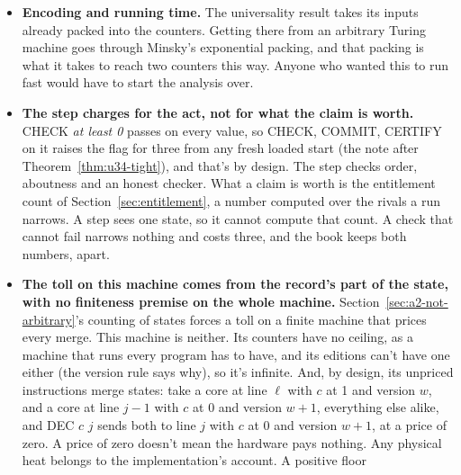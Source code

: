 \documentclass[11pt,twoside]{article}
\theoremstyle{thielethm}
\theoremstyle{thieledef}
\theoremstyle{thieledef}
\theoremstyle{thieledef}
\theoremstyle{thielethm}
\theoremstyle{thieleobs}
\theoremstyle{thielethm}
\begin{document}
\begin{itemize}
computably presented machine, with its reading decided by a program, its record carried as
a latch, and its ledger matched to within a surcharge of at most two when its reading starts at
no, and of three when it starts at yes. When the guest certifies with a ledger below three, no program on
that host, run from a clean start, matches its ledger exactly. A
machine outside that class, with a reading no program decides, isn't covered by either. The
host with a guest step built in, charging one per guest step whatever the step was, would have a
ledger at least the guest's and usually more; $U$'s is exact, and $U_P$'s is exact up to the
surcharge.
\item \textbf{Encoding and running time.} The universality result takes its inputs already
packed into the counters. Getting there from an arbitrary Turing machine goes through
Minsky's exponential packing, and that packing is
what it takes to reach two counters this way. Anyone who wanted this to run fast would have to
start the analysis over.
\item \textbf{The step charges for the act, not for what the claim is worth.} CHECK \emph{at
least 0} passes on every value, so CHECK, COMMIT, CERTIFY on it raises the flag for three from
any fresh loaded start (the note after Theorem~\ref{thm:u34-tight}), and that's by design. The
step checks order, aboutness and an honest checker. What a claim is worth is the entitlement
count of Section~\ref{sec:entitlement}, a number computed over the rivals a run narrows. A
step sees one state, so it cannot compute that count. A check that cannot fail narrows nothing
and costs three, and the book keeps both numbers, apart.
\item \textbf{The toll on this machine comes from the record's part of the state, with no finiteness premise on the whole machine.}
Section~\ref{sec:a2-not-arbitrary}'s counting of states forces a toll on a finite machine that prices
every merge. This machine is neither. Its counters have no ceiling, as a machine that runs every program has to have, and its editions can't have one either (the version rule says why), so it's infinite. And, by design, its unpriced instructions merge states: take a core at line $\ell$ with $c$ at 1 and version
$w$, and a core at line $j - 1$ with $c$ at 0 and version $w + 1$, everything else alike, and
DEC $c$ $j$ sends both to line $j$ with $c$ at 0 and version $w + 1$, at a price of zero. A price of zero
doesn't mean the hardware pays nothing. Any physical heat belongs to the implementation's account. A positive floor

\end{itemize}
\end{document}
